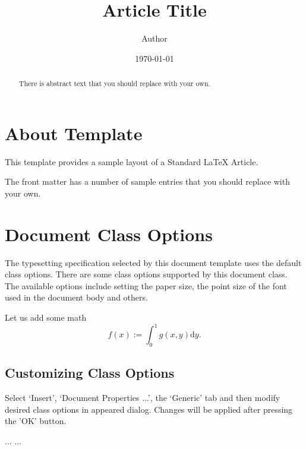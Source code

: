 \documentclass{article}
\begin{document}
\title{Article Title}
\author{Author}
\date{\today}
\maketitle

\begin{abstract}
    There is abstract text that you should replace with your own.
\end{abstract}


\section{About Template}
This template provides a sample layout of a Standard \LaTeX{} Article.

The front matter has a number of sample entries that you should replace
with your own. 

\section{Document Class Options}
The typesetting specification selected by this document template
uses the default class options. There are some class options 
supported by this document class. The available options include 
setting the paper size, the point size of the font used in the 
document body and others.

Let us add some math
$$f(x):=\int_0^1 g(x,y)\mathrm{d}y.$$

\subsection{Customizing Class Options}
Select `Insert', `Document Properties ...', the `Generic' tab
and then modify desired class options in appeared dialog.
Changes will be applied after pressing the 'OK' button.

\begin{thebibliography}{99}
 ...
 ...
\end{thebibliography}
\end{document}
